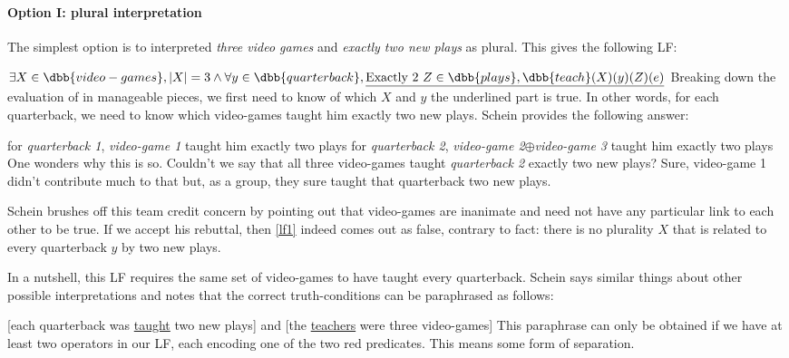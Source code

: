 \begin{nothing}
\paragraph{Option I: plural interpretation} The simplest option is to interpreted \emph{three video games} and \emph{exactly two new plays} as plural. This gives the following LF:

\ex\label{lf1}
$\exists X\in \dbb{video-games}, |X| = 3 \wedge \forall y\in \dbb{quarterback}, \underline{\text{Exactly 2 } Z\in \dbb{plays},  \dbb{teach}(X)(y)(Z)(e)}$
\xe
%
Breaking down the evaluation of \clastx in manageable pieces, we first need to know of which $X$ and $y$ the underlined part is true. In other words, for each quarterback, we need to know which video-games taught him exactly two new plays. Schein provides the following answer:

\pex
\a for \emph{quarterback 1}, \emph{video-game 1} taught him exactly two plays
\a for \emph{quarterback 2}, \emph{video-game 2}$\oplus$\emph{video-game 3} taught him exactly two plays
\xe
%
One wonders why this is so. Couldn't we say that all three video-games taught \emph{quarterback 2} exactly two new plays? Sure, video-game 1 didn't contribute much to that but, as a group, they sure taught that quarterback two new plays.

Schein brushes off this team credit concern by pointing out that video-games are inanimate and need not have any particular link to each other to be true\footnotemark{}. If we accept his rebuttal, then \cref{lf1} indeed comes out as false, contrary to fact: there is no plurality $X$ that is related to every quarterback $y$ by two new plays.

In a nutshell, this LF requires the same set of video-games to have taught every quarterback. Schein says similar things about other possible interpretations and notes that the correct truth-conditions can be paraphrased as follows:

\ex{}%
[each quarterback was \underline{taught} two new plays] and [the \underline{teachers} were three video-games]
\xe
%
This paraphrase can only be obtained if we have at least two operators in our LF, each encoding one of the two red predicates. This means some form of separation.



\end{nothing}
